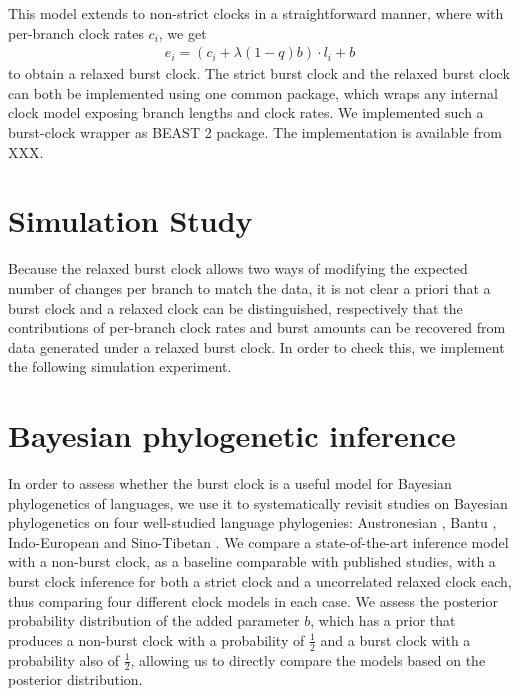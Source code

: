 \documentclass[a4paper,12pt]{scrartcl}
\begin{document}
This model extends to non-strict clocks in a straightforward manner, where with per-branch clock rates $c_i$, we get
\begin{align}
  e_i = (c_i + \lambda (1-q) b) \cdot l_i + b
  \label{eq:relaxed}
\end{align}
to obtain a relaxed burst clock.
The strict burst clock and the relaxed burst clock can both be implemented using one common package, which wraps any internal clock model exposing branch lengths and clock rates.
We implemented such a burst-clock wrapper as BEAST 2 package.
The implementation is available from XXX.

\section{Simulation Study}
Because the relaxed burst clock allows two ways of modifying the expected number
of changes per branch to match the data, it is not clear a priori that a burst
clock and a relaxed clock can be distinguished, respectively that the
contributions of per-branch clock rates and burst amounts can be recovered from
data generated under a relaxed burst clock.
In order to check this, we implement the following simulation experiment.

\section{Bayesian phylogenetic inference}

In order to assess whether the burst clock is a useful model for Bayesian
phylogenetics of languages, we use it to systematically revisit studies on Bayesian phylogenetics
on four well-studied language phylogenies:
Austronesian
\parencite{gray2009language,greenhill2017evolutionary,greenhill2018population},
Bantu
\parencite{grollemund2015bantu,greenhill2018population,currie2013cultural},
Indo-European
\parencite{bouckaert2012mapping,chang2015ancestryconstrained,gray2003language,holm2017steppe,rama2018three,willems2016using}
and
Sino-Tibetan \parencite{sagart2019dated,zhang2019phylogenetic}.
We compare
a state-of-the-art inference model with a non-burst clock, as a baseline
comparable with published studies, with a burst clock inference
for both a strict clock and a uncorrelated relaxed clock each, thus
comparing four different clock models in each case.
We assess the posterior probability distribution of the added
parameter $b$, which has a prior that produces a non-burst clock with a
probability of $\frac{1}{2}$ and a burst clock with a probability also of
$\frac{1}{2}$, allowing us to directly compare the models based on the posterior
distribution.
\end{document}
